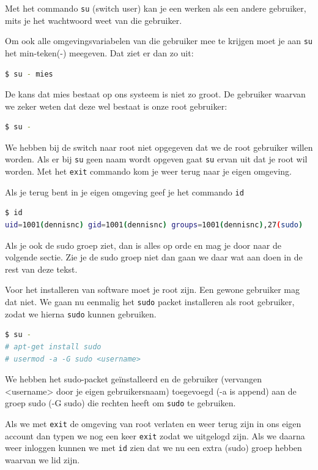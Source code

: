 Met het commando \texttt{su} (switch user) kan je een werken als een andere gebruiker, mits je het wachtwoord weet van die gebruiker.

Om ook alle omgevingsvariabelen van die gebruiker mee te krijgen moet je aan \texttt{su} het min-teken(-) meegeven. Dat ziet er dan zo uit:
\begin{lstlisting}[language=bash]
$ su - mies
\end{lstlisting}

De kans dat mies bestaat op ons systeem is niet zo groot. De gebruiker waarvan we zeker weten dat deze wel bestaat is onze root gebruiker:
\begin{lstlisting}[language=bash]
$ su -
\end{lstlisting}
We hebben bij de switch naar root niet opgegeven dat we de root gebruiker willen worden. Als er bij \texttt{su} geen naam wordt opgeven gaat \texttt{su} ervan uit dat je root wil worden. Met het \texttt{exit} commando kom je weer terug naar je eigen omgeving.

Als je terug bent in je eigen omgeving geef je het commando \texttt{id}
\begin{lstlisting}[language=bash]
$ id
uid=1001(dennisnc) gid=1001(dennisnc) groups=1001(dennisnc),27(sudo)
\end{lstlisting}
Als je ook de sudo groep ziet, dan is alles op orde en mag je door naar de volgende sectie. Zie je de sudo groep niet dan gaan we daar wat aan doen in de rest van deze tekst.

Voor het installeren van software moet je root zijn. Een gewone gebruiker mag dat niet. We gaan nu eenmalig het \texttt{sudo} packet installeren als root gebruiker, zodat we hierna \texttt{sudo} kunnen gebruiken.

\begin{lstlisting}[language=bash]
$ su -
# apt-get install sudo
# usermod -a -G sudo <username>
\end{lstlisting}
We hebben het sudo-packet ge\"installeerd en de gebruiker (vervangen <username> door je eigen gebruikersnaam) toegevoegd (-a is append) aan de groep sudo (-G sudo) die rechten heeft om \texttt{sudo} te gebruiken.

Als we met \texttt{exit} de omgeving van root verlaten en weer terug zijn in ons eigen account dan typen we nog een keer \texttt{exit} zodat we uitgelogd zijn. Als we daarna weer inloggen kunnen we met \texttt{id} zien dat we nu een extra (sudo) groep hebben waarvan we lid zijn.

